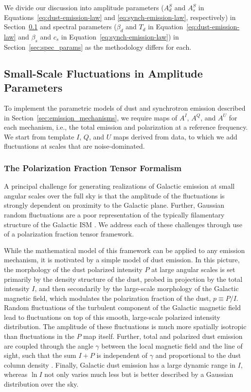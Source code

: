 \documentclass[twocolumn]{aastex631}
\begin{document}
We divide our discussion into amplitude parameters ($A_d^S$ and $A_s^S$ in Equations~\ref{eq:dust-emission-law} and \ref{eq:synch-emission-law}, respectively) in Section~\ref{sec:amp_params} and spectral parameters ($\beta_d$ and $T_d$ in Equation~\ref{eq:dust-emission-law} and $\beta_s$ and $c_s$ in Equation~\ref{eq:synch-emission-law}) in Section~\ref{sec:spec_params} as the methodology differs for each.

\subsection{Small-Scale Fluctuations in Amplitude Parameters} \label{sec:amp_params}
To implement the parametric models of dust and synchrotron emission described in Section~\ref{sec:emission_mechanisms}, we require maps of $A^I$, $A^Q$, and $A^U$ for each mechanism, i.e., the total emission and polarization at a reference frequency. We start from template $I$, $Q$, and $U$ maps derived from data, to which we add fluctuations at scales that are noise-dominated.

\subsubsection{The Polarization Fraction Tensor Formalism} \label{sec:polfrac}
A principal challenge for generating realizations of Galactic emission at small angular scales over the full sky is that the amplitude of the fluctuations is strongly dependent on proximity to the Galactic plane. Further, Gaussian random fluctuations are a poor representation of the typically filamentary structure of the Galactic ISM \citep[e.g.,][]{Hacar:2023}. We address each of these challenges through use of a polarization fraction tensor framework.

While the mathematical model of this framework can be applied to any emission mechanism, it is motivated by a simple model of dust emission. In this picture, the morphology of the dust polarized intensity $P$ at large angular scales is set primarily by the density structure of the dust, probed in projection by the total intensity $I$, and then secondarily by the large-scale morphology of the Galactic magnetic field, which modulates the polarization fraction of the dust, $p \equiv P/I$. Random fluctuations of the turbulent component of the Galactic magnetic field lead to fluctuations on top of this smooth, large-scale polarized intensity distribution. The amplitude of these fluctuations is much more spatially isotropic than fluctuations in the $P$ map itself. Further, total and polarized dust emission are coupled through the angle $\gamma$ between the local magnetic field and the line of sight, such that the sum $I+P$ is independent of $\gamma$ and proportional to the dust column density \citep{Hensley:2019}. Finally, Galactic dust emission has a large dynamic range in $I$, whereas $\ln I$ not only varies much less but is better described by a Gaussian distribution over the sky.
\end{document}
